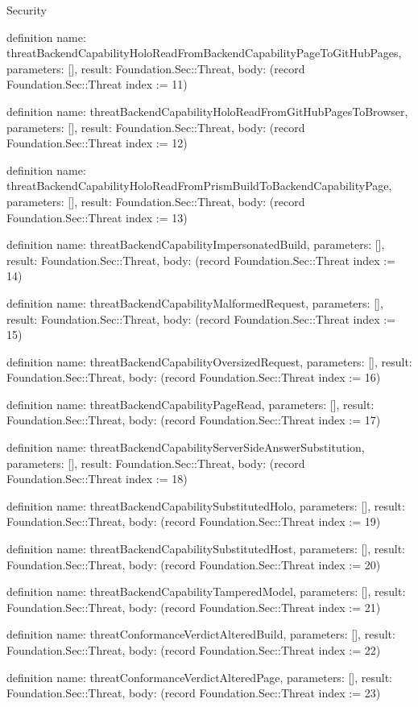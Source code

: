 \begin{lexlean}{Security}
\begin{semanticmodule}
definition{
  name: threatBackendCapabilityHoloReadFromBackendCapabilityPageToGitHubPages,
  parameters: [],
  result: Foundation.Sec::Threat,
  body: (record Foundation.Sec::Threat {index := 11})
}

definition{
  name: threatBackendCapabilityHoloReadFromGitHubPagesToBrowser,
  parameters: [],
  result: Foundation.Sec::Threat,
  body: (record Foundation.Sec::Threat {index := 12})
}

definition{
  name: threatBackendCapabilityHoloReadFromPrismBuildToBackendCapabilityPage,
  parameters: [],
  result: Foundation.Sec::Threat,
  body: (record Foundation.Sec::Threat {index := 13})
}

definition{
  name: threatBackendCapabilityImpersonatedBuild,
  parameters: [],
  result: Foundation.Sec::Threat,
  body: (record Foundation.Sec::Threat {index := 14})
}

definition{
  name: threatBackendCapabilityMalformedRequest,
  parameters: [],
  result: Foundation.Sec::Threat,
  body: (record Foundation.Sec::Threat {index := 15})
}

definition{
  name: threatBackendCapabilityOversizedRequest,
  parameters: [],
  result: Foundation.Sec::Threat,
  body: (record Foundation.Sec::Threat {index := 16})
}

definition{
  name: threatBackendCapabilityPageRead,
  parameters: [],
  result: Foundation.Sec::Threat,
  body: (record Foundation.Sec::Threat {index := 17})
}

definition{
  name: threatBackendCapabilityServerSideAnswerSubstitution,
  parameters: [],
  result: Foundation.Sec::Threat,
  body: (record Foundation.Sec::Threat {index := 18})
}

definition{
  name: threatBackendCapabilitySubstitutedHolo,
  parameters: [],
  result: Foundation.Sec::Threat,
  body: (record Foundation.Sec::Threat {index := 19})
}

definition{
  name: threatBackendCapabilitySubstitutedHost,
  parameters: [],
  result: Foundation.Sec::Threat,
  body: (record Foundation.Sec::Threat {index := 20})
}

definition{
  name: threatBackendCapabilityTamperedModel,
  parameters: [],
  result: Foundation.Sec::Threat,
  body: (record Foundation.Sec::Threat {index := 21})
}

definition{
  name: threatConformanceVerdictAlteredBuild,
  parameters: [],
  result: Foundation.Sec::Threat,
  body: (record Foundation.Sec::Threat {index := 22})
}

definition{
  name: threatConformanceVerdictAlteredPage,
  parameters: [],
  result: Foundation.Sec::Threat,
  body: (record Foundation.Sec::Threat {index := 23})
}


\end{semanticmodule}
\end{lexlean}

